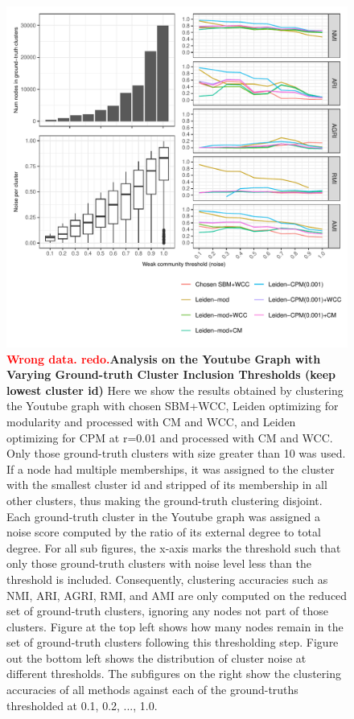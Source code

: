 \documentclass[aps,pre,superscriptaddress]{revtex4}
\begin{document}
\begin{figure}[!htpb]
\centering
\includegraphics[]{figures/accuracy_choose_lower.pdf}
\caption[]{\textbf{\textcolor{red}{Wrong data. redo.}Analysis on the Youtube Graph with Varying Ground-truth Cluster Inclusion Thresholds (keep lowest cluster id)} Here we show the results obtained by clustering the Youtube graph with chosen SBM+WCC, Leiden optimizing for modularity and processed with CM and WCC, and Leiden optimizing for CPM at r=0.01 and processed with CM and WCC. Only those ground-truth clusters with size greater than 10 was used. If a node had multiple memberships, it was assigned to the cluster with the smallest cluster id and stripped of its membership in all other clusters, thus making the ground-truth clustering disjoint. Each ground-truth cluster in the Youtube graph was assigned a noise score computed by the ratio of its external degree to total degree. For all sub figures, the x-axis marks the threshold such that only those ground-truth clusters with noise level less than the threshold is included. Consequently, clustering accuracies such as NMI, ARI, AGRI, RMI, and AMI are only computed on the reduced set of ground-truth clusters, ignoring any nodes not part of those clusters. Figure at the top left shows how many nodes remain in the set of ground-truth clusters following this thresholding step. Figure out the bottom left shows the distribution of cluster noise at different thresholds. The subfigures on the right show the clustering accuracies of all methods against each of the ground-truths thresholded at 0.1, 0.2, ..., 1.0. }
\label{fig:youtube-accuracy-choose-lower}
\end{figure}
\end{document}

